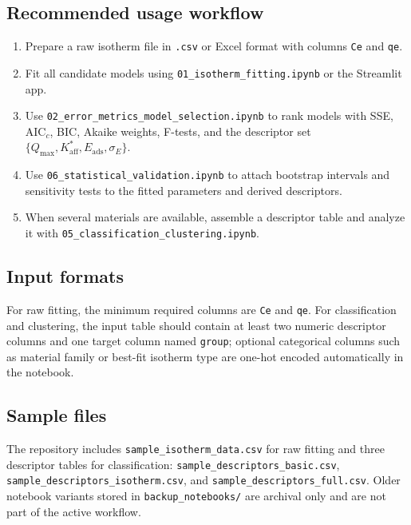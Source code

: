 \documentclass[journal=jacsat,manuscript=article]{achemso}
\begin{document}
\subsection{Recommended usage workflow}
\label{sec:si_notebook_workflow}

\begin{enumerate}
	\item Prepare a raw isotherm file in \texttt{.csv} or Excel format with
	columns \texttt{Ce} and \texttt{qe}.
	\item Fit all candidate models using
	\texttt{01\_isotherm\_fitting.ipynb} or the Streamlit app.
	\item Use \texttt{02\_error\_metrics\_model\_selection.ipynb} to rank models
	with SSE, AIC$_c$, BIC, Akaike weights, F-tests, and the descriptor set
	$\{Q_{\max}, K_{\mathrm{aff}}^{\ast}, E_{\mathrm{ads}}, \sigma_E\}$.
	\item Use \texttt{06\_statistical\_validation.ipynb} to attach bootstrap
	intervals and sensitivity tests to the fitted parameters and derived
	descriptors.
	\item When several materials are available, assemble a descriptor table and
	analyze it with \texttt{05\_classification\_clustering.ipynb}.
\end{enumerate}

\subsection{Input formats}
\label{sec:si_notebook_inputs}

For raw fitting, the minimum required columns are \texttt{Ce} and \texttt{qe}.
For classification and clustering, the input table should contain at least two
numeric descriptor columns and one target column named \texttt{group}; optional
categorical columns such as material family or best-fit isotherm type are
one-hot encoded automatically in the notebook.

\subsection{Sample files}
\label{sec:si_notebook_samples}

The repository includes \texttt{sample\_isotherm\_data.csv} for raw fitting and
three descriptor tables for classification:
\texttt{sample\_descriptors\_basic.csv},
\texttt{sample\_descriptors\_isotherm.csv}, and
\texttt{sample\_descriptors\_full.csv}. Older notebook variants stored in
\texttt{backup\_notebooks/} are archival only and are not part of the active
workflow.


% 
\end{document}
